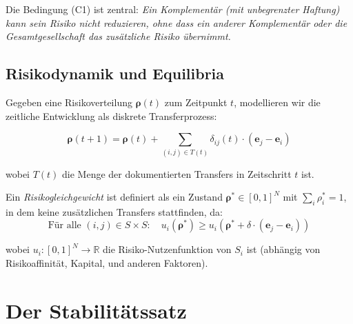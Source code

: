 \documentclass[a4paper,12pt]{article}
\theoremstyle{definition}
\begin{document}
Die Bedingung (C1) ist zentral: \emph{Ein Komplementär (mit unbegrenzter Haftung) kann sein Risiko nicht reduzieren, ohne dass ein anderer Komplementär oder die Gesamtgesellschaft das zusätzliche Risiko übernimmt.}

\subsection{Risikodynamik und Equilibria}

Gegeben eine Risikoverteilung $\boldsymbol{\rho}(t)$ zum Zeitpunkt $t$, modellieren wir die zeitliche Entwicklung als diskrete Transferprozess:

\begin{equation}
\boldsymbol{\rho}(t+1) = \boldsymbol{\rho}(t) + \sum_{(i,j) \in T(t)} \delta_{ij}(t) \cdot (\mathbf{e}_j - \mathbf{e}_i)
\end{equation}

wobei $T(t)$ die Menge der dokumentierten Transfers in Zeitschritt $t$ ist.

Ein \emph{Risikogleichgewicht} ist definiert als ein Zustand $\boldsymbol{\rho}^* \in [0,1]^N$ mit $\sum_i \rho_i^* = 1$, in dem keine zusätzlichen Transfers stattfinden, da:
\begin{equation}
\text{Für alle } (i,j) \in S \times S: \quad u_i(\boldsymbol{\rho}^*) \geq u_i(\boldsymbol{\rho}^* + \delta \cdot (\mathbf{e}_j - \mathbf{e}_i))
\end{equation}

wobei $u_i : [0,1]^N \to \mathbb{R}$ die Risiko-Nutzenfunktion von $S_i$ ist (abhängig von Risikoaffinität, Kapital, und anderen Faktoren).

\section{Der Stabilitätssatz}
\end{document}

